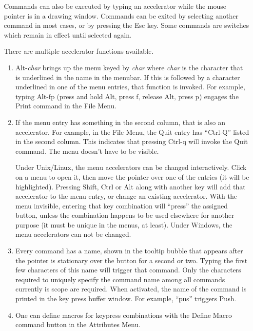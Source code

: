 Commands can also be executed by typing an accelerator while the mouse
pointer is in a drawing window.  Commands can be exited by selecting
another command in most cases, or by pressing the {\kb Esc} key.  Some
commands are switches which remain in effect until selected again.

There are multiple accelerator functions available.

\begin{enumerate}
\item{
{\kb Alt-}{\it char} brings up the menu keyed by {\it char} where {\it
char} is the character that is underlined in the name in the menubar. 
If this is followed by a character underlined in one of the menu
entries, that function is invoked.  For example, typing {\kb
Alt-fp} (press and hold {\kb Alt}, press {\kb f}, release {\kb Alt},
press {\kb p}) engages the {\cb Print} command in the {\cb File Menu}.
}
\item{
If the menu entry has something in the second column, that is also an
accelerator.  For example, in the {\cb File Menu}, the {\cb Quit}
entry has ``Ctrl-Q'' listed in the second column.  This indicates that
pressing {\kb Ctrl-q} will invoke the {\cb Quit} command.  The menu
doesn't have to be visible.

Under Unix/Linux, the menu accelerators can be changed interactively. 
Click on a menu to open it, then move the pointer over one of the
entries (it will be highlighted).  Pressing {\kb Shift}, {\kb Ctrl} or
{\kb Alt} along with another key will add that accelerator to the menu
entry, or change an existing accelerator.  With the menu invisible,
entering that key combination will ``press'' the assigned button,
unless the combination happens to be used elsewhere for another
purpose (it must be unique in the menus, at least).  Under Windows,
the menu accelerators can not be changed.
}
\item{
Every command has a name, shown in the tooltip bubble that appears
after the pointer is stationary over the button for a second or two. 
Typing the first few characters of this name will trigger that
command.  Only the characters required to uniquely specify the command
name among all commands currently is scope are required.  When
activated, the name of the command is printed in the key press buffer
window.  For example, ``{\vt pus}'' triggers {\cb Push}.
}
\item{
One can define macros for keypress combinations with the {\cb Define
Macro} command button in the {\cb Attributes Menu}.
}
\end{enumerate}


